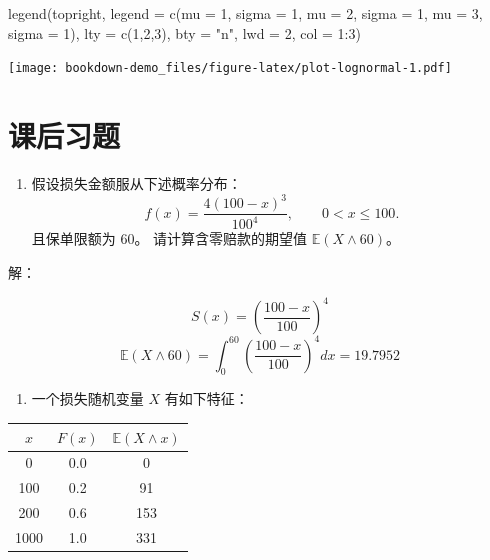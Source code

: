 \documentclass[
]{book}
\newenvironment{Shaded}{\begin{snugshade}}{\end{snugshade}}
\newcommand{\AttributeTok}[1]{\textcolor[rgb]{0.77,0.63,0.00}{#1}}
\newcommand{\DecValTok}[1]{\textcolor[rgb]{0.00,0.00,0.81}{#1}}
\newcommand{\FunctionTok}[1]{\textcolor[rgb]{0.00,0.00,0.00}{#1}}
\newcommand{\NormalTok}[1]{#1}
\newcommand{\SpecialCharTok}[1]{\textcolor[rgb]{0.00,0.00,0.00}{#1}}
\newcommand{\StringTok}[1]{\textcolor[rgb]{0.31,0.60,0.02}{#1}}
\providecommand{\tightlist}{%
  \setlength{\itemsep}{0pt}\setlength{\parskip}{0pt}}
\begin{document}
\begin{Shaded}
\begin{Highlighting}[]
\FunctionTok{legend}\NormalTok{(}\StringTok{\textquotesingle{}topright\textquotesingle{}}\NormalTok{,       }\AttributeTok{legend =} \FunctionTok{c}\NormalTok{(}\StringTok{\textquotesingle{}mu = 1, sigma = 1\textquotesingle{}}\NormalTok{, }
                                    \StringTok{\textquotesingle{}mu = 2, sigma = 1\textquotesingle{}}\NormalTok{, }
                                    \StringTok{\textquotesingle{}mu = 3, sigma = 1\textquotesingle{}}\NormalTok{),}
       \AttributeTok{lty =} \FunctionTok{c}\NormalTok{(}\DecValTok{1}\NormalTok{,}\DecValTok{2}\NormalTok{,}\DecValTok{3}\NormalTok{), }\AttributeTok{bty =} \StringTok{"n"}\NormalTok{, }\AttributeTok{lwd =} \DecValTok{2}\NormalTok{,  }\AttributeTok{col =} \DecValTok{1}\SpecialCharTok{:}\DecValTok{3}\NormalTok{)}
\end{Highlighting}
\end{Shaded}

\texttt{[image: bookdown-demo\_files/figure-latex/plot-lognormal-1.pdf]}

\hypertarget{ux8bfeux540eux4e60ux9898}{%
\section{课后习题}\label{ux8bfeux540eux4e60ux9898}}

\begin{enumerate}
\def\labelenumi{\arabic{enumi}.}
\tightlist
\item
  假设损失金额服从下述概率分布：
  \[
  f(x)=\frac{4(100-x)^3}{100^4},\quad\quad  0<x\le 100.
  \]
  且保单限额为 60。
  请计算含零赔款的期望值 \(\mathbb{E}(X \wedge 60)\)。
\end{enumerate}

解：

\[S(x)=\left(\frac{100-x}{100}\right)^4\]
\[
\mathbb{E}(X \wedge 60)
=\int_{0}^{60}\left(\frac{100-x}{100}\right)^4dx
= 19.7952
\]

\begin{enumerate}
\def\labelenumi{\arabic{enumi}.}
\setcounter{enumi}{1}
\tightlist
\item
  一个损失随机变量 \(X\) 有如下特征：
\end{enumerate}

\begin{longtable}[]{@{}ccc@{}}
\toprule
\(x\) & \(F(x)\) & \(\mathbb{E}(X\wedge x)\) \\
\midrule
\endhead
0 & 0.0 & 0 \\
100 & 0.2 & 91 \\
200 & 0.6 & 153 \\
1000 & 1.0 & 331 \\
\bottomrule
\end{longtable}
\end{document}
